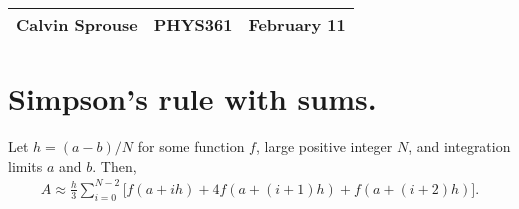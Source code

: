 \documentclass[a4paper, 12pt]{config/homework}
\begin{document}
\noindent
\begin{tabularx}{\textwidth}{>{\centering\arraybackslash}X>{\centering\arraybackslash}X>{\centering\arraybackslash}X}
Calvin Sprouse & PHYS361 & 2024 February 11\\
\midrule
\end{tabularx}

\noindent
\section*{Simpson's rule with sums.}
Let \(h=(a-b)/N\) for some function \(f\), large positive integer \(N\), and integration limits \(a\) and \(b\). Then,
\begin{align*}
    A \approx \frac{h}{3}\sum_{i=0}^{N-2}\bigg[ f(a+ih) + 4f(a+(i+1)h) + f(a + (i+2)h) \bigg].
\end{align*}
\end{document}
